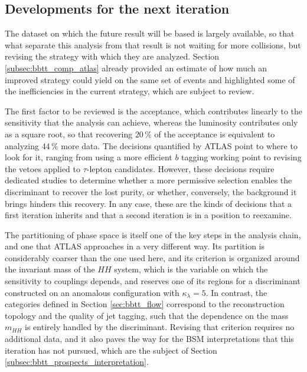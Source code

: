 \subsection{Developments for the next iteration}
\label{subsec:bbtt_prospects_analysis}
The dataset on which the future result will be based is largely available, so that what separate this analysis from that result is not waiting for more collisions, but revising the strategy with which they are analyzed. Section \ref{subsec:bbtt_comp_atlas} already provided an estimate of how much an improved strategy could yield on the same set of events and highlighted some of the inefficiencies in the current strategy, which are subject to review.\medskip

The first factor to be reviewed is the acceptance, which contributes linearly to the sensitivity that the analysis can achieve, whereas the luminosity contributes only as a square root, so that recovering $20\,\%$ of the acceptance is equivalent to analyzing $44\,\%$ more data. The decisions quantified by ATLAS point to where to look for it, ranging from using a more efficient $b$ tagging working point to revising the vetoes applied to $\tau$-lepton candidates. However, these decisions require dedicated studies to determine whether a more permissive selection enables the discriminant to recover the lost purity, or whether, conversely, the background it brings hinders this recovery. In any case, these are the kinds of decisions that a first iteration inherits and that a second iteration is in a position to reexamine.

The partitioning of phase space is itself one of the key steps in the analysis chain, and one that ATLAS approaches in a very different way. Its partition is considerably coarser than the one used here, and its criterion is organized around the invariant mass of the $HH$ system, which is the variable on which the sensitivity to couplings depends, and reserves one of its regions for a discriminant constructed on an anomalous configuration with $\kappa_\lambda = 5$. In contrast, the categories defined in Section \ref{sec:bbtt_flow} correspond to the reconstruction topology and the quality of jet tagging, such that the dependence on the mass $m_{HH}$ is entirely handled by the discriminant. Revising that criterion requires no additional data, and it also paves the way for the BSM interpretations that this iteration has not pursued, which are the subject of Section \ref{subsec:bbtt_prospects_interpretation}.



